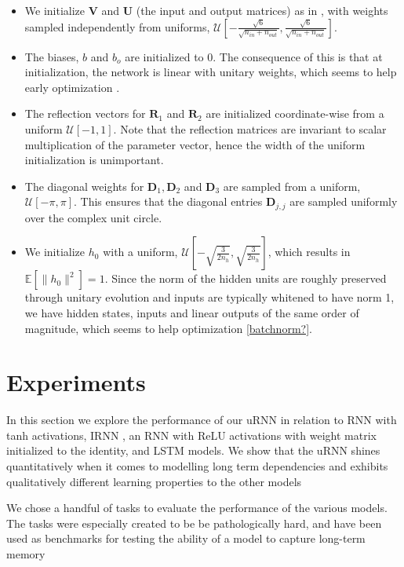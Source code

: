 \documentclass{article} %
\newcommand{\matr}[1]{\mathbf{#1}}
\begin{document}
\begin{itemize}
  \item We initialize $\matr{V}$ and $\matr{U}$ (the input and output matrices) as in \cite{Glorotinit},
  with weights sampled independently from uniforms, $\mathcal{U}\left[-\frac{\sqrt{6}}{\sqrt{n_{in}+ n_{out}}}, \frac{\sqrt{6}}{\sqrt{n_{in}+ n_{out}}}\right]$.
  \item The biases, $b$ and $b_o$ are initialized to 0. The consequence of this is that at initialization, 
    the network is linear with unitary weights, which seems to help early optimization \citep{Saxe2014}.
  \item The reflection vectors for $\matr{R}_1$ and $\matr{R}_2$ are initialized coordinate-wise from a 
  uniform $\mathcal{U}[-1, 1]$. Note that the reflection matrices are invariant to scalar multiplication 
  of the parameter vector, hence the width of the uniform initialization is unimportant.
  \item The diagonal weights for $\matr{D}_1, \matr{D}_2$ and $\matr{D}_3$ are sampled 
  from a uniform, $\mathcal{U}[-\pi, \pi]$. This ensures that the diagonal entries $\matr{D}_{j,j}$
  are sampled uniformly over the complex unit circle.
  \item We initialize $h_0$ with a uniform, 
  $\mathcal{U}\left[-\sqrt{\frac{3}{2n_h}}, \sqrt{\frac{3}{2n_h}} \right]$, 
  which results in $\mathbb{E}\left[\|h_0\|^2\right] = 1$. Since the norm of the hidden units are roughly 
  preserved through unitary evolution and inputs are typically whitened to have norm 1, 
  we have hidden states, inputs and linear outputs of the same order of magnitude, which seems to
  help optimization \ref{batchnorm?}.
\end{itemize}

\section{Experiments}

In this section we explore the performance of our uRNN in relation to RNN with tanh activations,
IRNN \citep{Quoc2015}, an RNN with ReLU activations with weight matrix initialized to the identity, 
and LSTM \citep{LSTM} models. We show that the uRNN shines quantitatively when it comes to modelling 
long term dependencies and exhibits qualitatively different learning properties to the other models 
 
We chose a handful of tasks to evaluate the performance of the various models.
The tasks were especially created to be be pathologically hard, and have been used 
as benchmarks for testing the ability of a model to capture long-term memory \citep{LSTM} \citep{Quoc2015} \citep{NTM}
\citep{HF}
\end{document}
